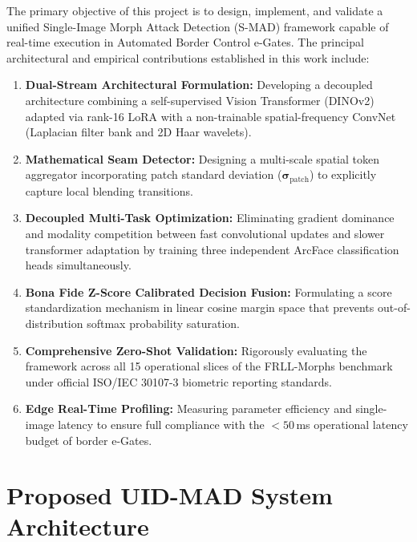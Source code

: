 \documentclass[11pt,a4paper]{article}
\begin{document}
The primary objective of this project is to design, implement, and validate a unified Single-Image Morph Attack Detection (S-MAD) framework capable of real-time execution in Automated Border Control e-Gates. The principal architectural and empirical contributions established in this work include:
\begin{enumerate}[leftmargin=*]
    \item \textbf{Dual-Stream Architectural Formulation:} Developing a decoupled architecture combining a self-supervised Vision Transformer (DINOv2) \cite{oquab2023dinov2} adapted via rank-16 LoRA \cite{hu2021lora} with a non-trainable spatial-frequency ConvNet (Laplacian filter bank and 2D Haar wavelets).
    \item \textbf{Mathematical Seam Detector:} Designing a multi-scale spatial token aggregator incorporating patch standard deviation ($\boldsymbol{\sigma}_{\text{patch}}$) to explicitly capture local blending transitions.
    \item \textbf{Decoupled Multi-Task Optimization:} Eliminating gradient dominance and modality competition between fast convolutional updates and slower transformer adaptation by training three independent ArcFace \cite{deng2019arcface} classification heads simultaneously.
    \item \textbf{Bona Fide Z-Score Calibrated Decision Fusion:} Formulating a score standardization mechanism in linear cosine margin space that prevents out-of-distribution softmax probability saturation.
    \item \textbf{Comprehensive Zero-Shot Validation:} Rigorously evaluating the framework across all 15 operational slices of the FRLL-Morphs benchmark \cite{debruine2017face} under official ISO/IEC 30107-3 \cite{iso30107_3} biometric reporting standards.
    \item \textbf{Edge Real-Time Profiling:} Measuring parameter efficiency and single-image latency to ensure full compliance with the $<50$\,ms operational latency budget of border e-Gates.
\end{enumerate}

\section{Proposed UID-MAD System Architecture}
\label{sec:methodology}
\end{document}
